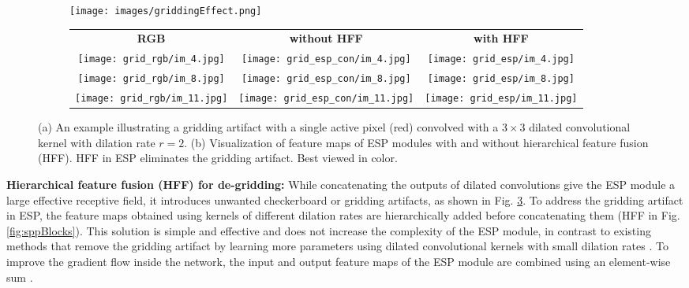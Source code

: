 \documentclass[runningheads]{llncs}
\def\Fig{Fig. }
\begin{document}
\begin{figure}[t!]
\centering
\begin{subfigure}[b]{0.22\columnwidth}
\centering
\texttt{[image: images/griddingEffect.png]}
\caption{}
\label{fig:gridArtifact}
\end{subfigure}
\hfill
\begin{subfigure}[b]{0.77\columnwidth}
  \centering
	\begin{tabular}{ccc}
    \textbf{RGB} & \textbf{without HFF} & \textbf{with HFF} \\
    \texttt{[image: grid\_rgb/im\_4.jpg]} & \texttt{[image: grid\_esp\_con/im\_4.jpg]} & \texttt{[image: grid\_esp/im\_4.jpg]}  \\
    \texttt{[image: grid\_rgb/im\_8.jpg]} & \texttt{[image: grid\_esp\_con/im\_8.jpg]} & \texttt{[image: grid\_esp/im\_8.jpg]}  \\
    \texttt{[image: grid\_rgb/im\_11.jpg]} & \texttt{[image: grid\_esp\_con/im\_11.jpg]} & \texttt{[image: grid\_esp/im\_11.jpg]}  \\
    \end{tabular}
  \caption{}
\label{fig:gridArtExm}
\end{subfigure}
\caption{(a) An example illustrating a gridding artifact with a single active pixel (red) convolved with a $3\times3$ dilated convolutional kernel with dilation rate $r=2$. (b) Visualization of feature maps of ESP modules with and without hierarchical feature fusion (HFF). HFF in ESP eliminates the gridding artifact. Best viewed in color.}
\label{fig:gridArtExmamination}
\end{figure}

\noindent \textbf{Hierarchical feature fusion (HFF) for de-gridding:} While concatenating the outputs of dilated convolutions give the ESP module a large effective receptive field, it introduces unwanted checkerboard or gridding artifacts, as shown in \Fig \ref{fig:gridArtExmamination}. To address the gridding artifact in ESP, the feature maps obtained using kernels of different dilation rates are hierarchically added before concatenating them (HFF in \Fig \ref{fig:sppBlocks}). This solution is simple and effective and does not increase the complexity of the ESP module, in contrast to  existing methods that remove the gridding artifact by learning more parameters using dilated convolutional kernels with small dilation rates \cite{yu2017dilated,wang2017understanding}. To improve the gradient flow inside the network, the input and output feature maps of the ESP module are combined using an element-wise sum \cite{he2016deep}.
\end{document}
